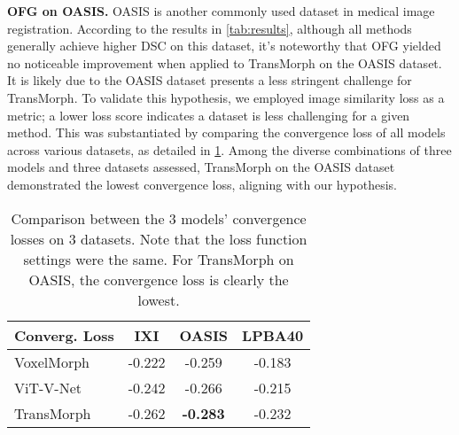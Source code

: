 \documentclass[10pt,twocolumn,letterpaper]{article}
\begin{document}
\textbf{OFG on OASIS.} OASIS \cite{10.1162/jocn.2007.19.9.1498} is another commonly used dataset in medical image registration. According to the results in \cref{tab:results}, although all methods generally achieve higher DSC on this dataset, it's noteworthy that OFG yielded no noticeable improvement when applied to TransMorph on the OASIS dataset. It is likely due to the OASIS dataset presents a less stringent challenge for TransMorph. To validate this hypothesis, we employed image similarity loss as a metric; a lower loss score indicates a dataset is less challenging for a given method. This was substantiated by comparing the convergence loss of all models across various datasets, as detailed in \cref{tab:converg-loss}. Among the diverse combinations of three models and three datasets assessed, TransMorph on the OASIS dataset demonstrated the lowest convergence loss, aligning with our hypothesis.







\begin{table}
\begin{center}
{\small{
    \begin{tabular}{l|ccc}
\toprule
    Converg. Loss & IXI \cite{ixi} & OASIS \cite{10.1162/jocn.2007.19.9.1498} & LPBA40 \cite{lpba} \\
    \midrule
    VoxelMorph \cite{Balakrishnan_2019} & -0.222 & -0.259 & -0.183 \\
    ViT-V-Net \cite{chen2021vitvnet} & -0.242 & -0.266 & -0.215 \\
    TransMorph \cite{Chen_2022} & -0.262 & \textbf{-0.283} & -0.232 \\
    \bottomrule
    \end{tabular}
}}
\end{center}
\caption{Comparison between the 3 models' convergence losses on 3 datasets. Note that the loss function settings were the same. For TransMorph on OASIS, the convergence loss is clearly the lowest.}
\label{tab:converg-loss}
\end{table}
\end{document}
